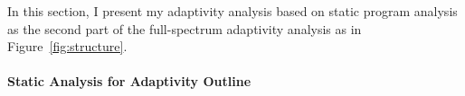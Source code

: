 In this section, I present my 
adaptivity analysis based on static program analysis as the second part of 
the full-spectrum adaptivity analysis as in Figure~\ref{fig:structure}. 
% 

% 


\paragraph{{Static Analysis for Adaptivity Outline}}


